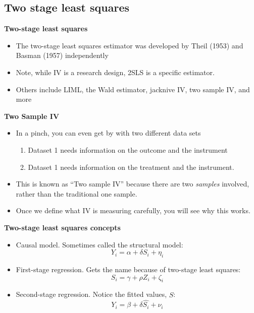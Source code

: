 \documentclass[notes=show]{beamer}
\begin{document}
\subsection{Two stage least squares}

\begin{frame}

	\begin{center}
	\textbf{Two-stage least squares}
	\end{center}
	
	\begin{itemize}
	\item The two-stage least squares estimator was developed by Theil (1953) and Basman (1957) independently
	\item Note, while IV is a research design, 2SLS is a specific estimator. 
	\item Others include LIML, the Wald estimator, jacknive IV, two sample IV, and more
	\end{itemize}
\end{frame}

\begin{frame}[plain]
\begin{center}
\textbf{Two Sample IV}
\end{center}

	\begin{itemize}
	\item In a pinch, you can even get by with two different data sets
		\begin{enumerate}
		\item Dataset 1 needs information on the outcome and the instrument 
		\item Dataset 1 needs  information on the treatment and the instrument.
		\end{enumerate}
	\item This is known as ``Two sample IV'' because there are two \emph{samples} involved, rather than the traditional one sample.
	\item Once we define what IV is measuring carefully, you will see why this works.
	\end{itemize}
\end{frame}


\begin{frame}[plain]

	\begin{center}
	\textbf{Two-stage least squares concepts}
	\end{center}
	
	\begin{itemize}
	\item Causal model.  Sometimes called the structural model:$$Y_i=\alpha + \delta{S_i} + \eta_i$$
	\item First-stage regression. Gets the name because of two-stage least squares:$$S_i = \gamma + \rho{Z_i} + \zeta_i$$
	\item Second-stage regression. Notice the fitted values, $\widehat{S}$:$$Y_i=\beta + \delta{\widehat{S_i}}+\nu_i$$
	\end{itemize}
\end{frame}
\end{document}
